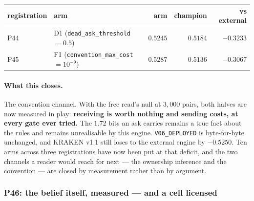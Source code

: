 \documentclass[11pt,letterpaper]{article}
\begin{document}
\begin{center}
\small
\begin{tabular}{llrrr}
\toprule
registration & arm & arm & champion & vs external \\
\midrule
P44 & D1 (\texttt{dead\_ask\_threshold} $=0.5$) & $0.5245$ & $0.5184$ & $-0.3233$ \\
P45 & F1 (\texttt{convention\_max\_cost} $=10^{-9}$) & $0.5287$ & $0.5136$ & $-0.3067$ \\
\bottomrule
\end{tabular}
\end{center}

\paragraph{What this closes.} The convention channel. With the free read's null
at $3{,}000$ pairs, both halves are now measured in play: \textbf{receiving is
worth nothing and sending costs, at every gate ever tried.} The $1.72$ bits an
ask carries remains a true fact about the rules and remains unrealisable by this
engine. \texttt{V06\_DEPLOYED} is byte-for-byte unchanged, and KRAKEN v1.1 still
loses to the external engine by $-0.5250$. Ten arms across three registrations have
now been put at that deficit, and the two channels a reader would reach for
next --- the ownership inference and the convention --- are closed by
measurement rather than by argument.


\subsubsection{P46: the belief itself, measured --- and a cell licensed}
\label{sec:p46}
\end{document}
